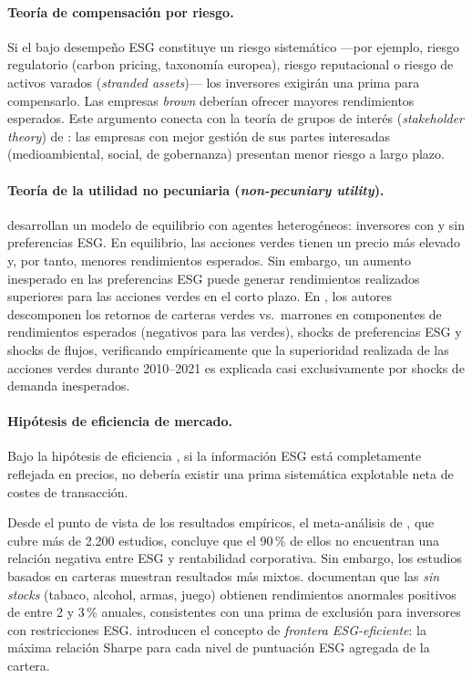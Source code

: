 \documentclass[12pt, a4paper]{article}
\begin{document}
\paragraph{Teor\'ia de compensaci\'on por riesgo.} Si el bajo desempe\~no ESG constituye
un riesgo sistem\'atico ---por ejemplo, riesgo regulatorio (carbon pricing, taxonom\'ia
europea), riesgo reputacional o riesgo de activos varados (\textit{stranded assets})---
los inversores exigir\'an una prima para compensarlo. Las empresas \textit{brown}
deber\'ian ofrecer mayores rendimientos esperados. Este argumento conecta con la teor\'ia
de grupos de inter\'es (\textit{stakeholder theory}) de \textcite{freeman1984}: las
empresas con mejor gesti\'on de sus partes interesadas (medioambiental, social,
de gobernanza) presentan menor riesgo a largo plazo.

\paragraph{Teor\'ia de la utilidad no pecuniaria (\textit{non-pecuniary utility}).}
\textcite{pastor2021} desarrollan un modelo de equilibrio con agentes heterog\'eneos:
inversores con y sin preferencias ESG. En equilibrio, las acciones verdes tienen un
precio m\'as elevado y, por tanto, menores rendimientos esperados. Sin embargo, un
aumento inesperado en las preferencias ESG puede generar rendimientos realizados
superiores para las acciones verdes en el corto plazo. En \textcite{pastor2022}, los
autores descomponen los retornos de carteras verdes vs.\ marrones en componentes de
rendimientos esperados (negativos para las verdes), shocks de preferencias ESG y
shocks de flujos, verificando emp\'iricamente que la superioridad realizada de las
acciones verdes durante 2010--2021 es explicada casi exclusivamente por shocks de
demanda inesperados.

\paragraph{Hip\'otesis de eficiencia de mercado.} Bajo la hip\'otesis de eficiencia
\parencite{fama1970}, si la informaci\'on ESG est\'a completamente reflejada en precios,
no deber\'ia existir una prima sistem\'atica explotable neta de costes de transacci\'on.

\medskip
Desde el punto de vista de los resultados emp\'iricos, el meta-an\'alisis de
\textcite{friede2015}, que cubre m\'as de 2.200 estudios, concluye que el 90\,\% de
ellos no encuentran una relaci\'on negativa entre ESG y rentabilidad corporativa.
Sin embargo, los estudios basados en carteras muestran resultados m\'as mixtos.
\textcite{hong2009} documentan que las \textit{sin stocks} (tabaco, alcohol, armas,
juego) obtienen rendimientos anormales positivos de entre 2 y 3\,\% anuales, consistentes
con una prima de exclusi\'on para inversores con restricciones ESG. \textcite{pedersen2021}
introducen el concepto de \textit{frontera ESG-eficiente}: la m\'axima relaci\'on Sharpe
para cada nivel de puntuaci\'on ESG agregada de la cartera.
\end{document}
